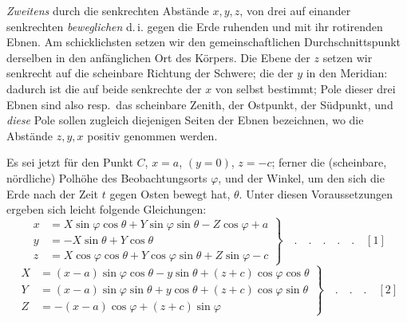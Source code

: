 \textit{Zweitens} durch die senkrechten Abstände $x,y,z$, von drei auf einander senkrechten \textit{beweglichen} d.\,i. gegen die Erde ruhenden und mit ihr rotirenden Ebnen. Am schicklichsten setzen wir den gemeinschaftlichen Durchschnittspunkt derselben in den anfänglichen Ort des Körpers. Die Ebene der $z$ setzen wir senkrecht auf die scheinbare Richtung der Schwere; die der $y$ in den Meridian: dadurch ist die auf beide senkrechte der $x$ von selbst bestimmt; Pole dieser drei Ebnen sind also resp.\ das scheinbare Zenith, der Ostpunkt, der Südpunkt, und \textit{diese} Pole sollen zugleich diejenigen Seiten der Ebnen bezeichnen, wo die Abstände $z,y,x$ positiv genommen werden.

Es sei jetzt für den Punkt $C$, $x=a$, $(y=0)$, $z=-c$; ferner die (scheinbare, nördliche) Polhöhe des Beobachtungsorts $\varphi$, und der Winkel, um den sich die Erde nach der Zeit $t$ gegen Osten bewegt hat, $\theta$. Unter diesen Voraussetzungen ergeben sich leicht folgende Gleichungen:
\[
\left.\begin{aligned}
x&=X\sin\varphi\cos\theta+Y\sin\varphi\sin\theta-Z\cos\varphi+a\\
y&=-X\sin\theta+Y\cos\theta\\
z&=X\cos\varphi\cos\theta+Y\cos\varphi\sin\theta+Z\sin\varphi-c
\end{aligned}\right\}\quad.\quad.\quad.\quad.\quad.\quad[1]
\]
\[
\left.\begin{aligned}
X&=(x-a)\sin\varphi\cos\theta-y\sin\theta+(z+c)\cos\varphi\cos\theta\\
Y&=(x-a)\sin\varphi\sin\theta+y\cos\theta+(z+c)\cos\varphi\sin\theta\\
Z&=-(x-a)\cos\varphi+(z+c)\sin\varphi
\end{aligned}\right\}\quad.\quad.\quad.\quad[2]
\]

